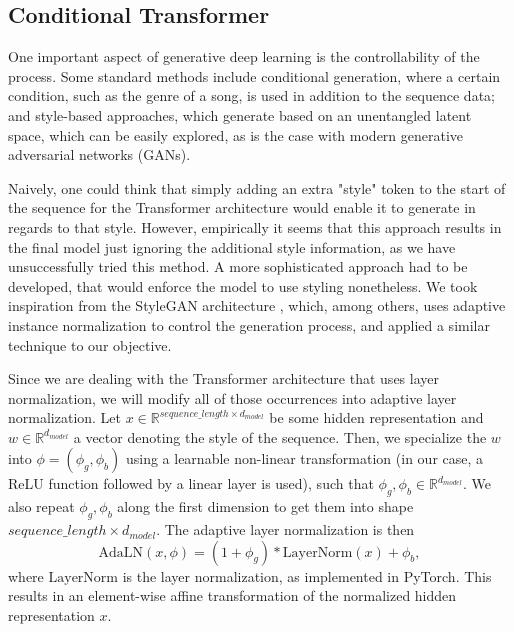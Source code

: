 \documentclass{article}
\begin{document}
\subsection{Conditional Transformer}

One important aspect of generative deep learning is the controllability of the process. Some standard methods include conditional generation, where a certain condition, such as the genre of a song, is used in addition to the sequence data; and style-based approaches, which generate based on an unentangled latent space, which can be easily explored, as is the case with modern generative adversarial networks (GANs).

Naively, one could think that simply adding an extra "style" token to the start of the sequence for the Transformer architecture would enable it to generate in regards to that style. However, empirically it seems that this approach results in the final model just ignoring the additional style information, as we have unsuccessfully tried this method. A more sophisticated approach had to be developed, that would enforce the model to use styling nonetheless. We took inspiration from the StyleGAN architecture \cite{karras2019stylebased}, which, among others, uses adaptive instance normalization to control the generation process, and applied a similar technique to our objective.

Since we are dealing with the Transformer architecture that uses layer normalization, we will modify all of those occurrences into adaptive layer normalization. Let $x \in \mathbb{R}^{sequence\_length \times d_{model}}$ be some hidden representation and $w \in \mathbb{R}^{d_{model}}$ a vector denoting the style of the sequence. Then, we specialize the $w$ into $\phi=(\phi_g, \phi_b)$ using a learnable non-linear transformation (in our case, a ReLU function followed by a linear layer is used), such that $\phi_g, \phi_b \in \mathbb{R}^{d_{model}}$. We also repeat $\phi_g, \phi_b$ along the first dimension to get them into shape $sequence\_length \times d_{model}$. The adaptive layer normalization is then 
\begin{equation}
    \mathrm{AdaLN}(x, \phi) = (1 + \phi_g) * \mathrm{LayerNorm}(x) + \phi_b,
\end{equation}
where $\mathrm{LayerNorm}$ is the layer normalization, as implemented in PyTorch. This results in an element-wise affine transformation of the normalized hidden representation $x$.
\end{document}
